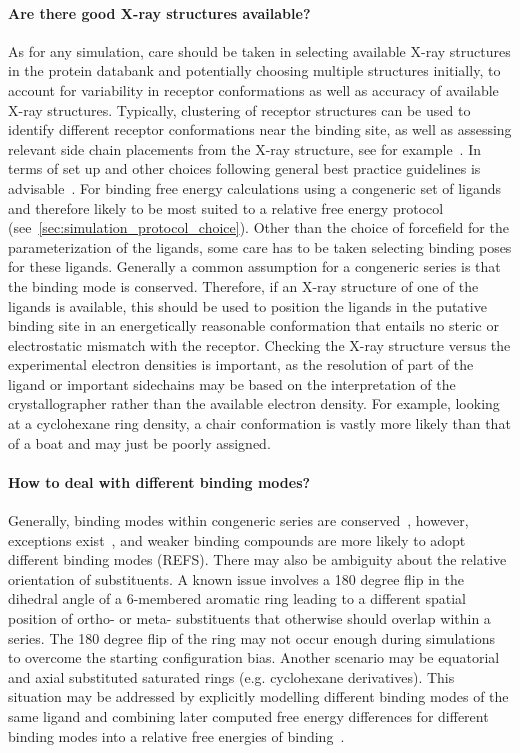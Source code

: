 \documentclass[9pt,bestpractices]{livecoms}
\begin{document}
\paragraph{Are there good X-ray structures available?}
As for any simulation, care should be taken in selecting available X-ray structures in the protein databank and potentially choosing multiple structures initially, to account for variability in receptor conformations as well as accuracy of available X-ray structures. Typically, clustering of receptor structures can be used to identify different receptor conformations near the binding site, as well as assessing relevant side chain placements from the X-ray structure, see for example~\cite{mey2016blinded}. In terms of set up and other choices following general best practice guidelines is advisable~\cite{braun2018best}.
%
For binding free energy calculations using a congeneric set of ligands and therefore likely to be most suited to a relative free energy protocol (see~\ref{sec:simulation_protocol_choice}). Other than the choice of forcefield for the parameterization of the ligands, some care has to be taken selecting binding poses for these ligands. Generally a common assumption for a congeneric series is that the binding mode is conserved. Therefore, if an X-ray structure of one of the ligands is available, this should be used to position the ligands in the putative binding site in an energetically reasonable conformation that entails no steric or electrostatic mismatch with the receptor. Checking the X-ray structure versus the experimental electron densities is important, as the resolution of part of the ligand or important sidechains may be based on the interpretation of the crystallographer rather than the available electron density. For example, looking at a cyclohexane ring density, a chair conformation is vastly more likely than that of a boat and may just be poorly assigned. 
%
\paragraph{How to deal with different binding modes?}
Generally, binding modes within congeneric series are conserved~\cite{wacker2010conserved}, however, exceptions exist~\cite{brandt2011congeneric,nazare2005probing}, and weaker binding compounds are more likely to adopt different binding modes (REFS). There may also be ambiguity about the relative orientation of substituents. A known issue involves a 180 degree flip in the dihedral angle of a 6-membered aromatic ring leading to a different spatial position of ortho- or meta- substituents that otherwise should overlap within a series. The 180 degree flip of the ring may not occur enough during simulations to overcome the starting configuration bias. Another scenario may be equatorial and axial substituted saturated rings (e.g. cyclohexane derivatives). This situation may be addressed by explicitly modelling different binding modes of the same ligand and combining later computed free energy differences for different binding modes into a relative free energies of binding~\cite{kaus2015how}.
%
\end{document}
